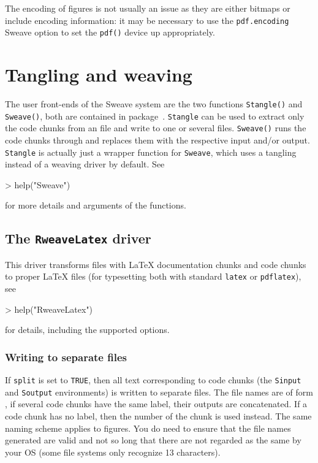 \documentclass[a4paper]{article}
\begin{document}
The encoding of figures is not usually an issue as they are either
bitmaps or include encoding information: it may be necessary to use
the \texttt{pdf.encoding} Sweave option to set the \texttt{pdf()}
device up appropriately.


\section{Tangling and weaving}

The user front-ends of the Sweave system are the two \R{} functions
\texttt{Stangle()} and \texttt{Sweave()}, both are contained in
package~.  \texttt{Stangle} can be used to extract only
the code chunks from an  file and write to one or several
files.  \texttt{Sweave()} runs the code chunks through \R{} and replaces
them with the respective input and/or output.  \texttt{Stangle} is
actually just a wrapper function for \texttt{Sweave}, which uses a
tangling instead of a weaving driver by default. See
\begin{Schunk}
\begin{Sinput}
> help("Sweave")
\end{Sinput}
\end{Schunk}
for more details and arguments of the functions.

\subsection{The \texttt{RweaveLatex} driver}

This driver transforms  files with \LaTeX{} documentation
chunks and \R{} code chunks to proper \LaTeX{} files (for typesetting both
with standard \texttt{latex} or \texttt{pdflatex}), see
\begin{Schunk}
\begin{Sinput}
> help("RweaveLatex")
\end{Sinput}
\end{Schunk}
for details, including the supported options.

\subsubsection{Writing to separate files}

If \texttt{split} is set to \texttt{TRUE}, then all text corresponding
to code chunks (the \texttt{Sinput} and \texttt{Soutput} environments)
is written to separate files. The file names are of form
, if several code chunks have the same
label, their outputs are concatenated. If a code chunk has no label,
then the number of the chunk is used instead. The same naming scheme
applies to figures.  You do need to ensure that the file names
generated are valid and not so long that there are not regarded as the
same by your OS (some file systems only recognize 13 characters).
\end{document}
